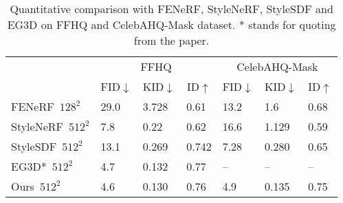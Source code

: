 \documentclass[acmtog]{acmart}
\begin{document}
\begin{table}[t]
\centering
\begin{tabular}{l|lll|lll} 
\hline
                   & \multicolumn{3}{c}{FFHQ}                                                                                   \vline  & \multicolumn{3}{c}{CelebAHQ-Mask}                                                                             \\
                   & \multicolumn{1}{c}{FID$\downarrow$} & \multicolumn{1}{c}{KID$\downarrow$} & \multicolumn{1}{c}{ID$\uparrow$}
                   \vline & \multicolumn{1}{c}{FID$\downarrow$} & \multicolumn{1}{c}{KID$\downarrow$} & \multicolumn{1}{c}{ID$\uparrow$}  \\ 
\hline
FENeRF~$128^2$      & 29.0                                & 3.728                                & 0.61                                 & 13.2                                & 1.6                                 & 0.68                                  \\
StyleNeRF~$512^{2}$ & 7.8                                 & 0.22                                 &  0.62                                & 16.6                                   & 1.129                                    & 0.59                                 \\
StyleSDF~$512^{2}$  & 13.1                                & 0.269                                &  0.742                                & 7.28                                    &  0.280                                   &  0.65                                 \\
EG3D*~$512^{2}$      & 4.7                                 & 0.132                                    &  0.77                                & --                                    & --                                    & --                            \\

Ours~$512^{2}$     & 4.6                                 &       0.130                               &      0.76                            & 4.9                                     & 0.135                                    & 0.75                                  \\
\hline
\end{tabular}
  \caption{Quantitative comparison with FENeRF, StyleNeRF, StyleSDF and EG3D on FFHQ and CelebAHQ-Mask dataset. * stands for quoting from the paper.}
  \label{tab:comparison}
\end{table}
\end{document}
